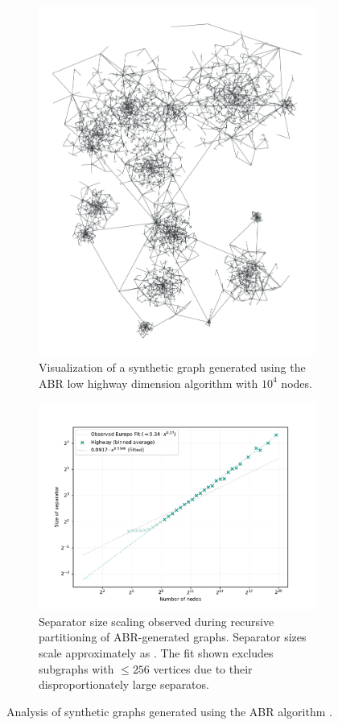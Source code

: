 \begin{figure}[tbhp]
	\centering
	\begin{subfigure}{0.35\linewidth}
		\centering
		\includegraphics[height=\linewidth, angle=90]{graphics/highway.png}
        \caption{Visualization of a synthetic graph generated using the ABR low highway dimension algorithm with \(10^4\) nodes.}
		\label{fig:abr_graph_viz}
	\end{subfigure}
	\hfill
	\begin{subfigure}{0.55\linewidth}
		\centering
		\includegraphics[width=\linewidth]{graphics/sep_highway.pdf}
		\caption{Separator size scaling observed during recursive partitioning of ABR-generated graphs. Separator sizes scale approximately as . The fit shown excludes subgraphs with \( \le 256 \) vertices due to their disproportionately large separatos.}
		\label{fig:abr_graph_sep_plot}
	\end{subfigure}
	\caption{Analysis of synthetic graphs generated using the ABR algorithm \cite{abraham_highway_2010}.}
	\label{fig:abr_graph_separators}
\end{figure}

